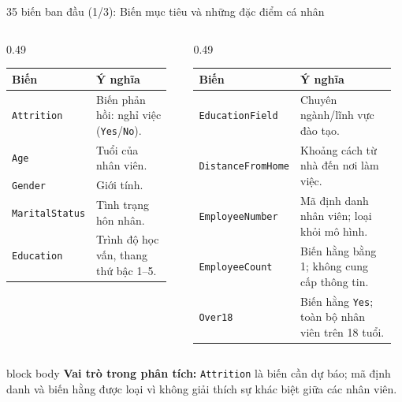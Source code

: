 \documentclass[10pt,aspectratio=169]{beamer}
\begin{document}
\begin{frame}{35 biến ban đầu (1/3): Biến mục tiêu và những đặc điểm cá nhân}
  \scriptsize
  \renewcommand{\arraystretch}{1.17}
  \begin{columns}[T,onlytextwidth]
    \begin{column}{0.49\textwidth}
      \begin{tabular}{>{\raggedright\arraybackslash}p{0.37\linewidth}
                      >{\raggedright\arraybackslash}p{0.57\linewidth}}
        \toprule
        \textbf{Biến} & \textbf{Ý nghĩa}\\
        \midrule
        \texttt{Attrition} & Biến phản hồi: nghỉ việc (\texttt{Yes}/\texttt{No}).\\
        \texttt{Age} & Tuổi của nhân viên.\\
        \texttt{Gender} & Giới tính.\\
        \texttt{MaritalStatus} & Tình trạng hôn nhân.\\
        \texttt{Education} & Trình độ học vấn, thang thứ bậc 1--5.\\
        \bottomrule
      \end{tabular}
    \end{column}
    \begin{column}{0.49\textwidth}
      \begin{tabular}{>{\raggedright\arraybackslash}p{0.39\linewidth}
                      >{\raggedright\arraybackslash}p{0.55\linewidth}}
        \toprule
        \textbf{Biến} & \textbf{Ý nghĩa}\\
        \midrule
        \texttt{EducationField} & Chuyên ngành/lĩnh vực đào tạo.\\
        \texttt{DistanceFromHome} & Khoảng cách từ nhà đến nơi làm việc.\\
        \texttt{EmployeeNumber} & Mã định danh nhân viên; loại khỏi mô hình.\\
        \texttt{EmployeeCount} & Biến hằng bằng 1; không cung cấp thông tin.\\
        \texttt{Over18} & Biến hằng \texttt{Yes}; toàn bộ nhân viên trên 18 tuổi.\\
        \bottomrule
      \end{tabular}
    \end{column}
  \end{columns}

  \vspace{0.30cm}
  \begin{beamercolorbox}[sep=0.14cm,rounded=true]{block body}
    \centering\small
    \textbf{Vai trò trong phân tích:}
    \texttt{Attrition} là biến cần dự báo; mã định danh và biến hằng được
    loại vì không giải thích sự khác biệt giữa các nhân viên.
  \end{beamercolorbox}
\end{frame}
\end{document}
